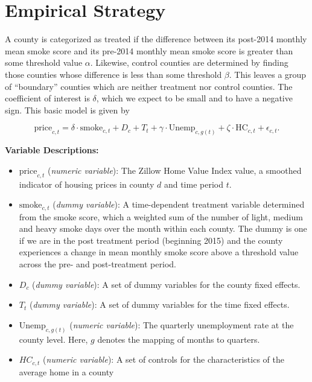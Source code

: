 \documentclass[12pt]{article}
\begin{document}
\section{Empirical Strategy}

A county is categorized as treated if the difference between its post-2014 monthly mean smoke 
score and its pre-2014 monthly mean smoke score is greater than some threshold value $\alpha$.
Likewise, control counties are determined by finding those counties whose difference is less
than some threshold $\beta$.  This leaves a group of ``boundary'' counties which are neither
treatment nor control counties.  The coefficient of interest is $\delta$, which we expect to be small and to have a negative sign.  This basic model is given by \begin{singlespace}$$\text{price}_{c,t} = \delta\cdot\text{smoke}_{c,t}+ D_c + T_t +\gamma\cdot\text{Unemp}_{c,g(t)} + \zeta\cdot\text{HC}_{c,t} + \epsilon_{c,t}. $$

\textbf{Variable Descriptions:}

\begin{itemize}
\item $\text{price}_{c,t}$ (\textit{numeric variable}): The Zillow Home Value Index 
value, a smoothed indicator of housing prices in county $d$ and time period $t$.
\item $\text{smoke}_{c,t}$ (\textit{dummy variable}): A time-dependent treatment variable
determined from the smoke score, which a weighted sum of the number of light, medium
and heavy smoke days over the month within each county.  The dummy is one if we are in the
post treatment period (beginning 2015) and the county
experiences a change in mean monthly smoke score above a threshold value across the pre- and post-treatment period.
\item $D_c$ (\textit{dummy variable}): A set of dummy variables for the county fixed effects.  
\item $T_t$ (\textit{dummy variable}): A set of dummy variables for the time fixed  effects.
\item $\text{Unemp}_{c,g(t)}$ (\textit{numeric variable}): The quarterly unemployment rate at the county level.  Here, $g$ denotes the mapping of months to quarters.  
\item $HC_{c,t}$ (\textit{numeric variable}): A set of controls for the characteristics of the average home in a county
\end{itemize}
\end{singlespace}
\end{document}
